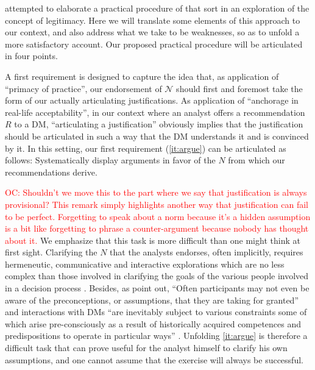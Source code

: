 \documentclass[preprint, french, english, 11pt, authoryear]{elsarticle}%
\newcommand{\commentOC}[1]{\textcolor{red}{OC: #1}}
\newcommand{\adv}{\mathscr{N}}
\begin{document}
\citet{meinard_what_2017} attempted to elaborate a practical procedure of that sort in an exploration of the concept of legitimacy. Here we will translate some elements of this approach to our context, and also address what we take to be weaknesses, so as to unfold a more satisfactory account. Our proposed practical procedure will be articulated in four points.

A first requirement is designed to capture the idea that, as application of “primacy of practice”, our endorsement of $\adv$ should first and foremost take the form of our actually articulating justifications. 
As application of ``anchorage in real-life acceptability'', in our context where an analyst offers a recommendation $R$ to a \ac{DM}, ``articulating a justification'' obviously implies that the justification should be articulated in such a way that the \ac{DM} understands it and is convinced by it.
In this setting, our first requirement (\cref{it:argue}) can be articulated as follows: Systematically display arguments in favor of the $N$ from which our recommendations derive.

\begin{changebar}\commentOC{Shouldn’t we move this to the part where we say that justification is always provisional? This remark simply highlights another way that justification can fail to be perfect. Forgetting to speak about a norm because it’s a hidden assumption is a bit like forgetting to phrase a counter-argument because nobody has thought about it.} We emphasize that this task is more difficult than one might think at first sight.
Clarifying the $N$ that the analysts endorses, often implicitly, requires hermeneutic, communicative and interactive explorations which are no less complex than those involved in clarifying the goals of the various people involved in a decision process \citep{reisach_creation_2016}.
Besides, as \citet{cronin_issues_2014} point out, ``Often participants may not even be aware of the preconceptions, or assumptions, that they are taking for granted'' and interactions with \acp{DM} 
``are inevitably subject to various constraints some of which arise pre-consciously as a result of historically acquired competences and predispositions to operate in particular ways'' \citep{brocklesby_ethics_2009}.
Unfolding \cref{it:argue} is therefore a difficult task that can prove useful for the analyst himself to clarify his own assumptions, and one cannot assume that the exercise will always be successful.\end{changebar}
\end{document}
